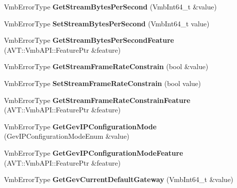 \begin{DoxyCompactItemize}
\item 
\hypertarget{classMakoCamera_ad83cd41e213f1b4f59154e1f1869c102}{Vmb\-Error\-Type {\bfseries Get\-Stream\-Bytes\-Per\-Second} (Vmb\-Int64\-\_\-t \&value)}\label{classMakoCamera_ad83cd41e213f1b4f59154e1f1869c102}

\item 
\hypertarget{classMakoCamera_a8c50b7e494032d6c68a90150f67ddc12}{Vmb\-Error\-Type {\bfseries Set\-Stream\-Bytes\-Per\-Second} (Vmb\-Int64\-\_\-t value)}\label{classMakoCamera_a8c50b7e494032d6c68a90150f67ddc12}

\item 
\hypertarget{classMakoCamera_a4f643321bcda60272e12669831a2c3f7}{Vmb\-Error\-Type {\bfseries Get\-Stream\-Bytes\-Per\-Second\-Feature} (A\-V\-T\-::\-Vmb\-A\-P\-I\-::\-Feature\-Ptr \&feature)}\label{classMakoCamera_a4f643321bcda60272e12669831a2c3f7}

\item 
\hypertarget{classMakoCamera_a682a0594f15588087e6d68eafe35b67b}{Vmb\-Error\-Type {\bfseries Get\-Stream\-Frame\-Rate\-Constrain} (bool \&value)}\label{classMakoCamera_a682a0594f15588087e6d68eafe35b67b}

\item 
\hypertarget{classMakoCamera_aa641a057896aa2371e0e15f969b50abf}{Vmb\-Error\-Type {\bfseries Set\-Stream\-Frame\-Rate\-Constrain} (bool value)}\label{classMakoCamera_aa641a057896aa2371e0e15f969b50abf}

\item 
\hypertarget{classMakoCamera_a1d90f969c7e423fd8f08a0a94dabc03a}{Vmb\-Error\-Type {\bfseries Get\-Stream\-Frame\-Rate\-Constrain\-Feature} (A\-V\-T\-::\-Vmb\-A\-P\-I\-::\-Feature\-Ptr \&feature)}\label{classMakoCamera_a1d90f969c7e423fd8f08a0a94dabc03a}

\item 
\hypertarget{classMakoCamera_ab0a2d2d3d1f571c62125730d177e8248}{Vmb\-Error\-Type {\bfseries Get\-Gev\-I\-P\-Configuration\-Mode} (Gev\-I\-P\-Configuration\-Mode\-Enum \&value)}\label{classMakoCamera_ab0a2d2d3d1f571c62125730d177e8248}

\item 
\hypertarget{classMakoCamera_aba1b7bef72530e1aa3b7c9f426a08ca2}{Vmb\-Error\-Type {\bfseries Get\-Gev\-I\-P\-Configuration\-Mode\-Feature} (A\-V\-T\-::\-Vmb\-A\-P\-I\-::\-Feature\-Ptr \&feature)}\label{classMakoCamera_aba1b7bef72530e1aa3b7c9f426a08ca2}

\item 
\hypertarget{classMakoCamera_a3eadaeb6d17becb2d1f9826033bc9eda}{Vmb\-Error\-Type {\bfseries Get\-Gev\-Current\-Default\-Gateway} (Vmb\-Int64\-\_\-t \&value)}\label{classMakoCamera_a3eadaeb6d17becb2d1f9826033bc9eda}


\end{DoxyCompactItemize}
